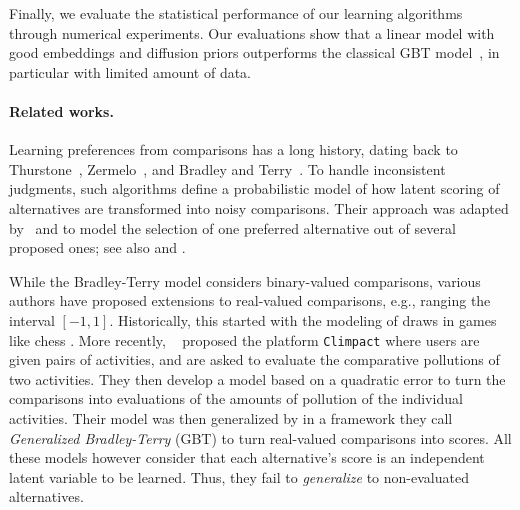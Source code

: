 \documentclass{article}
\begin{document}
Finally, we evaluate the statistical performance of our 
learning algorithms through numerical experiments.
Our evaluations show that a linear model with good embeddings and diffusion priors outperforms the classical GBT model~\cite{DBLP:conf/aaai/FageotFHV24}, in particular with limited amount of data.













\paragraph{Related works.}
Learning preferences from comparisons has a long history, 
dating back to Thurstone~\cite{thurstone27}, 
Zermelo~\cite{zermelo1929berechnung},
and Bradley and Terry~\cite{bradley1952rank}.
To handle inconsistent judgments, 
such algorithms define a probabilistic model 
of how latent scoring of alternatives are transformed
into noisy comparisons.
Their approach was adapted by~\cite{luce1959individual} and \cite{plackett1975analysis} to model the selection of one preferred alternative out of several proposed ones; see also \cite{mcfaddenConditionalLogitAnalysis1974} and \cite[Chap. 3]{maddalaLimitedDependentQualitativeVariables1983}.

While the Bradley-Terry model considers binary-valued comparisons, various authors have proposed extensions to real-valued comparisons, e.g., ranging the interval $[-1, 1]$.
Historically, this started with the modeling of draws in games like chess \cite{davidson1970extending}.
More recently, ~\cite{DBLP:journals/corr/abs-1911-11658} 
proposed the platform \texttt{Climpact} where users are given pairs of activities,
and are asked to evaluate the comparative pollutions of two activities.
They then develop a model based on a quadratic error to turn the comparisons
into evaluations of the amounts of pollution of the individual activities.
Their model was then generalized by \cite{DBLP:conf/aaai/FageotFHV24} 
in a framework
they call \emph{Generalized Bradley-Terry} (GBT)
to turn real-valued comparisons into scores.
All these models however consider that each alternative's score
is an independent latent variable to be learned.
Thus, they fail to \emph{generalize} to non-evaluated alternatives.
\end{document}
